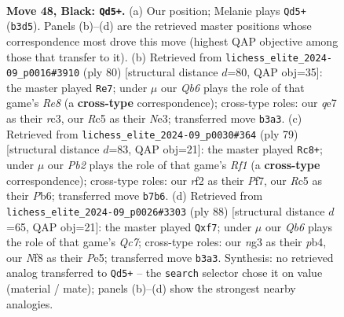 \documentclass[11pt]{article}
\begin{document}
\clearpage

\begin{figure}[p]\centering
\begin{subfigure}{0.46\textwidth}\centering
\resizebox{\linewidth}{!}{%
\newchessgame
\chessboard[
  setfen={5nk1/1p2Q2p/8/2r4p/8/1q4N1/5RK1/7R b - - 9 48},
  showmover=false,
  pgfstyle=straightmove, color=movearrow, markmove={b3-d5}
]}
\caption{}
\end{subfigure}\hfill
\begin{subfigure}{0.46\textwidth}\centering
\resizebox{\linewidth}{!}{%
\newchessgame
\chessboard[
  setfen={4R3/5p2/8/8/2Pkn3/2r1N2P/5PK1/8 w - - 9 41},
  showmover=false,
  pgfstyle=straightmove, color=movearrow, markmove={e8-e7}
]}
\caption{}
\end{subfigure}
\\[4pt]
\begin{subfigure}{0.46\textwidth}\centering
\resizebox{\linewidth}{!}{%
\newchessgame
\chessboard[
  setfen={5rk1/Q4pp1/1p1Rp2p/1N6/P7/8/2K5/2R2q2 b - - 13 40},
  showmover=false,
  pgfstyle=straightmove, color=movearrow, markmove={f8-c8}
]}
\caption{}
\end{subfigure}\hfill
\begin{subfigure}{0.46\textwidth}\centering
\resizebox{\linewidth}{!}{%
\newchessgame
\chessboard[
  setfen={6rk/2Q2p1p/8/4P3/1p6/4q2P/5RPK/8 w - - 1 45},
  showmover=false,
  pgfstyle=straightmove, color=movearrow, markmove={c7-f7}
]}
\caption{}
\end{subfigure}
\caption{\textbf{Move 48, Black: \texttt{Qd5+}.} (a) Our position; Melanie plays \texttt{Qd5+} (\texttt{b3d5}). Panels (b)--(d) are the retrieved master positions whose correspondence most drove this move (highest QAP objective among those that transfer to it). (b) Retrieved from \texttt{lichess\_elite\_2024-09\_p0016\#3910} (ply 80) [structural distance $d$=80, QAP obj=35]: the master played \texttt{Re7}; under $\mu$ our \emph{Qb6} plays the role of that game's \emph{Re8} (a \textbf{cross-type} correspondence); cross-type roles: our \emph{q}e7 as their \emph{r}c3, our \emph{R}c5 as their \emph{N}e3; transferred move \texttt{b3a3}. (c) Retrieved from \texttt{lichess\_elite\_2024-09\_p0030\#364} (ply 79) [structural distance $d$=83, QAP obj=21]: the master played \texttt{Rc8+}; under $\mu$ our \emph{Pb2} plays the role of that game's \emph{Rf1} (a \textbf{cross-type} correspondence); cross-type roles: our \emph{r}f2 as their \emph{P}f7, our \emph{R}c5 as their \emph{P}b6; transferred move \texttt{b7b6}. (d) Retrieved from \texttt{lichess\_elite\_2024-09\_p0026\#3303} (ply 88) [structural distance $d$=65, QAP obj=21]: the master played \texttt{Qxf7}; under $\mu$ our \emph{Qb6} plays the role of that game's \emph{Qc7}; cross-type roles: our \emph{n}g3 as their \emph{p}b4, our \emph{N}f8 as their \emph{P}e5; transferred move \texttt{b3a3}. Synthesis: no retrieved analog transferred to \texttt{Qd5+} -- the \texttt{search} selector chose it on value (material / mate); panels (b)--(d) show the strongest nearby analogies.}
\label{fig:thought-m95}
\end{figure}
\end{document}

